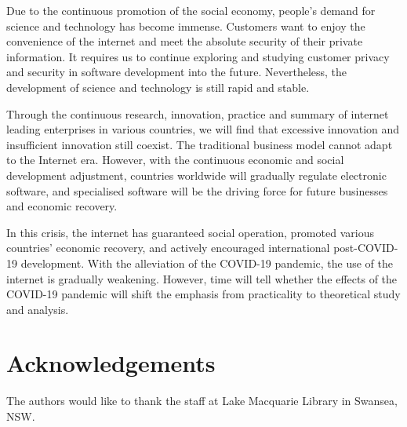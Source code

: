 \documentclass[12pt]{article}
\begin{document}
Due to the continuous promotion of the social economy, people’s demand for science and technology has become immense. Customers want to enjoy the convenience of the internet and meet the absolute security of their private information. It requires us to continue exploring and studying customer privacy and security in software development into the future. Nevertheless, the development of science and technology is still rapid and stable. \par 

Through the continuous research, innovation, practice and summary of internet leading enterprises in various countries, we will find that excessive innovation and insufficient innovation still coexist. The traditional business model cannot adapt to the Internet era. However, with the continuous economic and social development adjustment, countries worldwide will gradually regulate electronic software, and specialised software will be the driving force for future businesses and economic recovery. \par

In this crisis, the internet has guaranteed social operation, promoted various countries’ economic recovery, and actively encouraged international post-COVID-19 development. With the alleviation of the COVID-19 pandemic, the use of the internet is gradually weakening. However, time will tell whether the effects of the COVID-19 pandemic will shift the emphasis from practicality to theoretical study and analysis. \par

\section{Acknowledgements}
The authors would like to thank the staff at Lake Macquarie Library in Swansea, NSW.

\newpage




\end{document}
